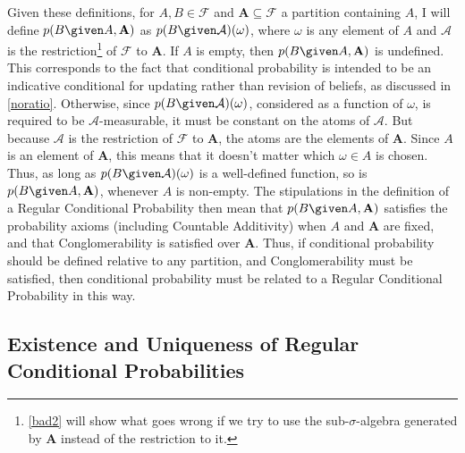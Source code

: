 Given these definitions, for $A,B\in\mathcal{F}$ and $\mathbf{A}\subseteq\mathcal{F}$ a partition containing $A$, I will define $p(B \given A,\mathbf{A})$ as $p(B \given \mathcal{A})(\omega)$, where $\omega$ is any element of $A$ and $\mathcal{A}$ is the restriction\footnote{\autoref{bad2} will show what goes wrong if we try to use the sub-$\sigma$-algebra generated by $\mathbf{A}$ instead of the restriction to it.} of $\mathcal{F}$ to $\mathbf{A}$. If $A$ is empty, then $p(B \given A,\mathbf{A})$ is undefined. This corresponds to the fact that conditional probability is intended to be an indicative conditional for updating rather than revision of beliefs, as discussed in \autoref{noratio}. Otherwise, since $p(B \given \mathcal{A})(\omega)$, considered as a function of $\omega$, is required to be $\mathcal{A}$-measurable, it must be constant on the atoms of $\mathcal{A}$. But because $\mathcal{A}$ is the restriction of $\mathcal{F}$ to $\mathbf{A}$, the atoms are the elements of $\mathbf{A}$. Since $A$ is an element of $\mathbf{A}$, this means that it doesn't matter which $\omega\in A$ is chosen. Thus, as long as $p(B \given \mathcal{A})(\omega)$ is a well-defined function, so is $p(B \given A,\mathbf{A})$, whenever $A$ is non-empty. The stipulations in the definition of a Regular Conditional Probability then mean that $p(B \given A,\mathbf{A})$ satisfies the probability axioms (including Countable Additivity) when $A$ and $\mathbf{A}$ are fixed, and that Conglomerability is satisfied over $\mathbf{A}$. Thus, if conditional probability should be defined relative to any partition, and Conglomerability must be satisfied, then conditional probability must be related to a Regular Conditional Probability in this way.

\subsection{Existence and Uniqueness of Regular Conditional Probabilities}

